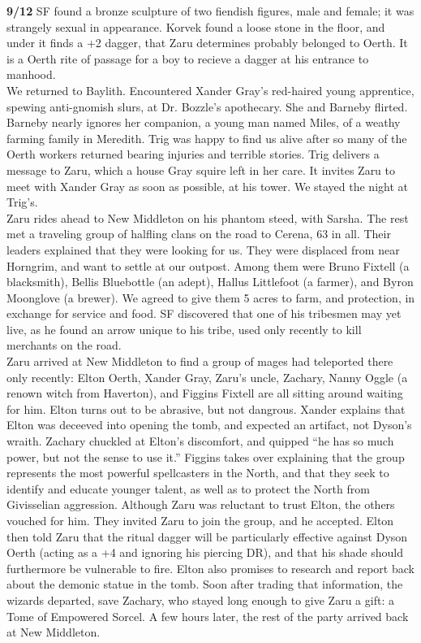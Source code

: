 \documentclass[letterpaper]{article}
\begin{document}
\noindent \textbf{9/12} SF found a bronze sculpture of two fiendish figures, male and female; it was strangely sexual in appearance. Korvek found a loose stone in the floor, and under it finds a +2 dagger, that Zaru determines probably belonged to Oerth.  It is a Oerth rite of passage for a boy to recieve a dagger at his entrance to manhood.  \\

\noindent We returned to Baylith.  Encountered Xander Gray's red-haired young apprentice, spewing anti-gnomish slurs, at Dr. Bozzle's apothecary.  She and Barneby flirted.  Barneby nearly ignores her companion, a young man named Miles, of a weathy farming family in Meredith. Trig was happy to find us alive after so many of the Oerth workers returned bearing injuries and terrible stories.  Trig delivers a message to Zaru, which a house Gray squire left in her care.  It invites Zaru to meet with Xander Gray as soon as possible, at his tower.  We stayed the night at Trig's.\\

\noindent Zaru rides ahead to New Middleton on his phantom steed, with Sarsha. The rest met a traveling group of halfling clans on the road to Cerena, 63 in all. Their leaders explained that they were looking for us.  They were displaced from near Horngrim, and want to settle at our outpost.  Among them were Bruno Fixtell (a blacksmith), Bellis Bluebottle (an adept), Hallus Littlefoot (a farmer), and Byron Moonglove (a brewer).  We agreed to give them 5 acres to farm, and protection, in exchange for service and food.  SF discovered that one of his tribesmen may yet live, as he found an arrow unique to his tribe, used only recently to kill merchants on the road.\\

\noindent Zaru arrived at New Middleton to find a group of mages had teleported there only recently: Elton Oerth, Xander Gray, Zaru's uncle, Zachary, Nanny Oggle (a renown witch from Haverton), and Figgins Fixtell are all sitting around waiting for him. Elton turns out to be abrasive, but not dangrous. Xander explains that Elton was deceeved into opening the tomb, and expected an artifact, not Dyson's wraith.  Zachary chuckled at Elton's discomfort, and quipped ``he has so much power, but not the sense to use it.'' Figgins takes over explaining that the group represents the most powerful spellcasters in the North, and that they seek to identify and educate younger talent, as well as to protect the North from Givisselian aggression.  Although Zaru was reluctant to trust Elton, the others vouched for him.  They invited Zaru to join the group, and he accepted.  Elton then told Zaru that the ritual dagger will be particularly effective against Dyson Oerth (acting as a +4 and ignoring his piercing DR), and that his shade should furthermore be vulnerable to fire.  Elton also promises to research and report back about the demonic statue in the tomb.  Soon after trading that information, the wizards departed, save Zachary, who stayed long enough to give Zaru a gift: a Tome of Empowered Sorcel.  A few hours later, the rest of the party arrived back at New Middleton. \\
\end{document}
